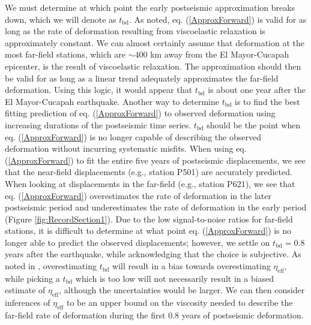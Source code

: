 \documentclass[draft,linenumbers]{AGUJournal}
\begin{document}
We must determine at which point the early postseismic approximation breaks down, which we will denote as $t_{\mathrm{bd}}$.  As noted, eq. (\ref{ApproxForward}) is valid for as long as the rate of deformation resulting from viscoelastic relaxation is approximately constant. We can almost certainly assume that deformation at the most far-field stations, which are ${\sim}400$ km away from the El Mayor-Cucapah epicenter, is the result of viscoelastic relaxation. The approximation should then be valid for as long as a linear trend adequately approximates the far-field deformation. Using this logic, it would appear that $t_{\mathrm{bd}}$ is about one year after the El Mayor-Cucapah earthquake.  Another way to determine $t_{\mathrm{bd}}$ is to find the best fitting prediction of eq. (\ref{ApproxForward}) to observed deformation using increasing durations of the postseismic time series.  $t_\mathrm{bd}$ should be the point when eq. (\ref{ApproxForward}) is no longer capable of describing the observed deformation without incurring systematic misfits.  When using eq. (\ref{ApproxForward}) to fit the entire five years of postseismic displacements, we see that the near-field displacements (e.g., station P501) are accurately predicted. When looking at displacements in the far-field (e.g., station P621), we see that eq. (\ref{ApproxForward}) overestimates the rate of deformation in the later postseismic period and underestimates the rate of deformation in the early period (Figure \ref{fig:RecordSection1}).  Due to the low signal-to-noise ratios for far-field stations, it is difficult to determine at what point eq. (\ref{ApproxForward}) is no longer able to predict the observed displacements; however, we settle on $t_{\mathrm{bd}}=0.8$ years after the earthquake, while acknowledging that the choice is subjective. As noted in \citet{Hines2016}, overestimating $t_{\mathrm{bd}}$ will result in a bias towards overestimating $\eta_{\mathrm{eff}}$, while picking a $t_\mathrm{bd}$ which is too low will not necessarily result in a biased estimate of $\eta_\mathrm{eff}$, although the uncertainties would be larger. We can then consider inferences of $\eta_{\mathrm{eff}}$ to be an upper bound on the viscosity needed to describe the far-field rate of deformation during the first 0.8 years of postseismic deformation. 
\end{document}
